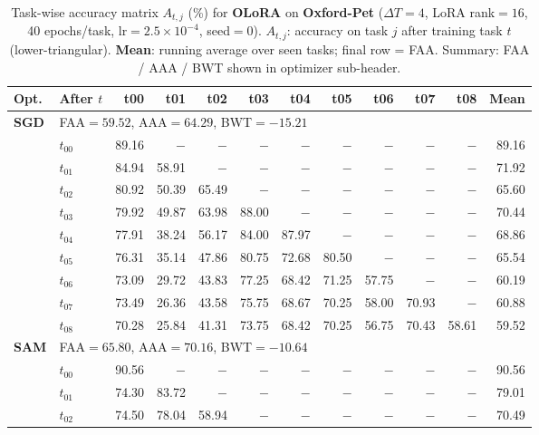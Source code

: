 \begin{table}[ht]
\centering
\caption{%
  Task-wise accuracy matrix $A_{t,j}$ (\%) for \textbf{OLoRA} on \textbf{Oxford-Pet}
  ($\Delta T=4$, LoRA rank$=16$, 40 epochs/task, lr$=2.5\times10^{-4}$, seed$=0$).
  $A_{t,j}$: accuracy on task $j$ after training task $t$ (lower-triangular).
  \textbf{Mean}: running average over seen tasks; final row = FAA.
  Summary: FAA / AAA / BWT shown in optimizer sub-header.
}
\label{tab:raw_olora_oxfordpet}
\setlength{\tabcolsep}{2.8pt}
\renewcommand{\arraystretch}{0.88}
\scriptsize
\begin{tabular}{@{}l l r r r r r r r r r r@{}}
\toprule
\textbf{Opt.} & \textbf{After $t$} & \textbf{t00} & \textbf{t01} & \textbf{t02} & \textbf{t03} & \textbf{t04} & \textbf{t05} & \textbf{t06} & \textbf{t07} & \textbf{t08} & \textbf{Mean} \\
\midrule
\multirow{10}{*}{\textbf{SGD}} & \multicolumn{11}{l}{\quad\small FAA$=59.52$,\; AAA$=64.29$,\; BWT$=-15.21$} \\
 & $t_{00}$ & 89.16 & $-$ & $-$ & $-$ & $-$ & $-$ & $-$ & $-$ & $-$ & 89.16 \\
 & $t_{01}$ & 84.94 & 58.91 & $-$ & $-$ & $-$ & $-$ & $-$ & $-$ & $-$ & 71.92 \\
 & $t_{02}$ & 80.92 & 50.39 & 65.49 & $-$ & $-$ & $-$ & $-$ & $-$ & $-$ & 65.60 \\
 & $t_{03}$ & 79.92 & 49.87 & 63.98 & 88.00 & $-$ & $-$ & $-$ & $-$ & $-$ & 70.44 \\
 & $t_{04}$ & 77.91 & 38.24 & 56.17 & 84.00 & 87.97 & $-$ & $-$ & $-$ & $-$ & 68.86 \\
 & $t_{05}$ & 76.31 & 35.14 & 47.86 & 80.75 & 72.68 & 80.50 & $-$ & $-$ & $-$ & 65.54 \\
 & $t_{06}$ & 73.09 & 29.72 & 43.83 & 77.25 & 68.42 & 71.25 & 57.75 & $-$ & $-$ & 60.19 \\
 & $t_{07}$ & 73.49 & 26.36 & 43.58 & 75.75 & 68.67 & 70.25 & 58.00 & 70.93 & $-$ & 60.88 \\
 & $t_{08}$ & 70.28 & 25.84 & 41.31 & 73.75 & 68.42 & 70.25 & 56.75 & 70.43 & 58.61 & 59.52 \\
\midrule
\multirow{10}{*}{\textbf{SAM}} & \multicolumn{11}{l}{\quad\small FAA$=65.80$,\; AAA$=70.16$,\; BWT$=-10.64$} \\
 & $t_{00}$ & 90.56 & $-$ & $-$ & $-$ & $-$ & $-$ & $-$ & $-$ & $-$ & 90.56 \\
 & $t_{01}$ & 74.30 & 83.72 & $-$ & $-$ & $-$ & $-$ & $-$ & $-$ & $-$ & 79.01 \\
 & $t_{02}$ & 74.50 & 78.04 & 58.94 & $-$ & $-$ & $-$ & $-$ & $-$ & $-$ & 70.49 \\

\end{tabular}
\end{table}
